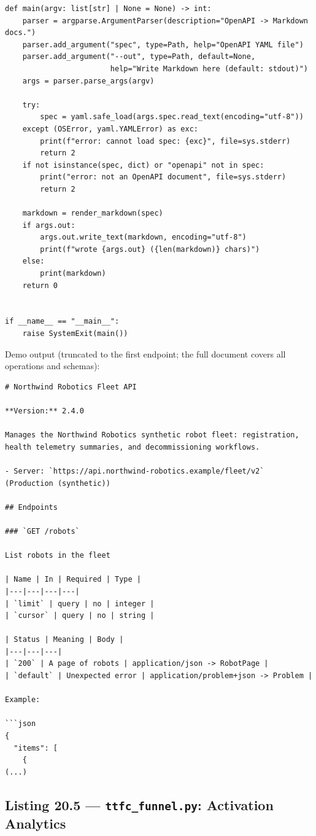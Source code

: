 \begin{verbatim}
def main(argv: list[str] | None = None) -> int:
    parser = argparse.ArgumentParser(description="OpenAPI -> Markdown docs.")
    parser.add_argument("spec", type=Path, help="OpenAPI YAML file")
    parser.add_argument("--out", type=Path, default=None,
                        help="Write Markdown here (default: stdout)")
    args = parser.parse_args(argv)

    try:
        spec = yaml.safe_load(args.spec.read_text(encoding="utf-8"))
    except (OSError, yaml.YAMLError) as exc:
        print(f"error: cannot load spec: {exc}", file=sys.stderr)
        return 2
    if not isinstance(spec, dict) or "openapi" not in spec:
        print("error: not an OpenAPI document", file=sys.stderr)
        return 2

    markdown = render_markdown(spec)
    if args.out:
        args.out.write_text(markdown, encoding="utf-8")
        print(f"wrote {args.out} ({len(markdown)} chars)")
    else:
        print(markdown)
    return 0


if __name__ == "__main__":
    raise SystemExit(main())
\end{verbatim}

Demo output (truncated to the first endpoint; the full document covers all
operations and schemas):

\begin{verbatim}
# Northwind Robotics Fleet API

**Version:** 2.4.0

Manages the Northwind Robotics synthetic robot fleet: registration, health telemetry summaries, and decommissioning workflows.

- Server: `https://api.northwind-robotics.example/fleet/v2` (Production (synthetic))

## Endpoints

### `GET /robots`

List robots in the fleet

| Name | In | Required | Type |
|---|---|---|---|
| `limit` | query | no | integer |
| `cursor` | query | no | string |

| Status | Meaning | Body |
|---|---|---|
| `200` | A page of robots | application/json -> RobotPage |
| `default` | Unexpected error | application/problem+json -> Problem |

Example:

```json
{
  "items": [
    {
(...)
\end{verbatim}

\subsection{Listing 20.5 --- \texttt{ttfc\_funnel.py}: Activation Analytics}
\label{sec:ch20-listing-ttfc}

